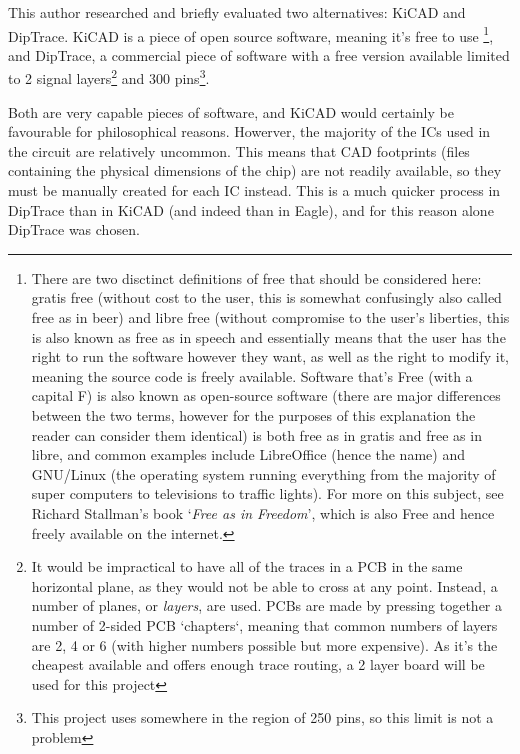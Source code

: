 This author researched and briefly evaluated two alternatives: KiCAD and
DipTrace. KiCAD is a piece of open source software, meaning it's free to
use
\footnote{There are two disctinct definitions of free that should be
considered here: gratis free (without cost to the user, this is somewhat
confusingly also called free as in beer) and libre free (without compromise to
the user's liberties, this is also known as free as in speech and essentially
means that the user has the right to run the software however they want, as
well as the right to modify it, meaning the source code is freely available.
Software that's Free (with a capital F) is also known as open-source software
(there are major differences between the two terms, however for the purposes
of this explanation the reader can consider them identical) is both free as in
gratis and free as in libre, and common examples include LibreOffice (hence
the name) and GNU/Linux (the operating system running everything from the
majority of super computers to televisions to traffic lights). For more on this
subject, see Richard Stallman's book `\textit{Free as in Freedom}', which is
also Free and hence freely available on the internet.},
and DipTrace, a commercial piece of software with a free version available
limited to 2 signal layers\footnote{It would be impractical to have all of the
  traces in a PCB in the same horizontal plane, as they would not be able to
  cross at any point. Instead, a number of planes, or \textit{layers}, are used.
  PCBs are made by pressing together a number of 2-sided PCB `chapters`, meaning
  that common numbers of layers are 2, 4 or 6 (with higher numbers possible but
  more expensive). As it's the cheapest available and offers enough trace
routing, a 2 layer board will be used for this project} and 300
pins\footnote{This project uses somewhere in the region of 250 pins, so this
limit is not a problem}.

Both are very capable pieces of software, and KiCAD would certainly be
favourable for philosophical reasons. Howerver, the majority of the ICs used in
the circuit are relatively uncommon. This means that CAD footprints (files
containing the physical dimensions of the chip) are not readily available, so
they must be manually created for each IC instead. This is a much quicker
process in DipTrace than in KiCAD (and indeed than in Eagle), and for this
reason alone DipTrace was chosen.

